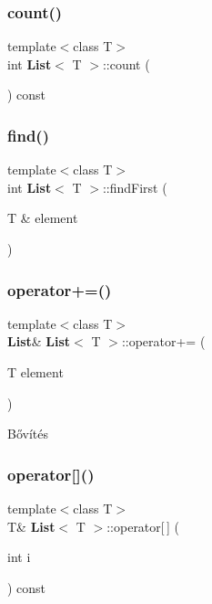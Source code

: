 \subsubsection{count()}
{\footnotesize\ttfamily template$<$class T$>$ \\
int \textbf{ List}$<$ T $>$\+::count (\begin{DoxyParamCaption}{ }\end{DoxyParamCaption}) const\hspace{0.3cm}{\ttfamily [inline]}}

\mbox{\label{class_list_ab3489ae135b990deedac885f8bd3030b}} 
\subsubsection{find()}
{\footnotesize\ttfamily template$<$class T$>$ \\
int \textbf{ List}$<$ T $>$\+::findFirst (\begin{DoxyParamCaption}\item[{T \&}]{element }\end{DoxyParamCaption})\hspace{0.3cm}{\ttfamily [inline]}}

\mbox{\label{class_list_a81a44c4aae9bb74b5166004cd28d9ac6}} 
\subsubsection{operator+=()}
{\footnotesize\ttfamily template$<$class T$>$ \\
\textbf{ List}\& \textbf{ List}$<$ T $>$\+::operator+= (\begin{DoxyParamCaption}\item[{T}]{element }\end{DoxyParamCaption})\hspace{0.3cm}{\ttfamily [inline]}}

Bővítés \mbox{\label{class_list_a80967ab44431031fb55fd2fe635b7b5e}} 
\subsubsection{operator[]()}
{\footnotesize\ttfamily template$<$class T$>$ \\
T\& \textbf{ List}$<$ T $>$\+::operator[$\,$] (\begin{DoxyParamCaption}\item[{int}]{i }\end{DoxyParamCaption}) const\hspace{0.3cm}{\ttfamily [inline]}}

